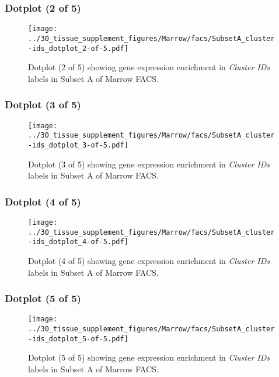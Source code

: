 \clearpage

\subsubsection{Dotplot (2 of 5)}
\begin{figure}[h]
\centering
\texttt{[image: ../30\_tissue\_supplement\_figures/Marrow/facs/SubsetA\_cluster-ids\_dotplot\_2-of-5.pdf]}

\caption{ Dotplot (2 of 5)  showing gene expression enrichment in \emph{Cluster IDs} labels in Subset A of Marrow FACS. }
\end{figure}


\clearpage

\subsubsection{Dotplot (3 of 5)}
\begin{figure}[h]
\centering
\texttt{[image: ../30\_tissue\_supplement\_figures/Marrow/facs/SubsetA\_cluster-ids\_dotplot\_3-of-5.pdf]}

\caption{ Dotplot (3 of 5)  showing gene expression enrichment in \emph{Cluster IDs} labels in Subset A of Marrow FACS. }
\end{figure}


\clearpage

\subsubsection{Dotplot (4 of 5)}
\begin{figure}[h]
\centering
\texttt{[image: ../30\_tissue\_supplement\_figures/Marrow/facs/SubsetA\_cluster-ids\_dotplot\_4-of-5.pdf]}

\caption{ Dotplot (4 of 5)  showing gene expression enrichment in \emph{Cluster IDs} labels in Subset A of Marrow FACS. }
\end{figure}


\clearpage

\subsubsection{Dotplot (5 of 5)}
\begin{figure}[h]
\centering
\texttt{[image: ../30\_tissue\_supplement\_figures/Marrow/facs/SubsetA\_cluster-ids\_dotplot\_5-of-5.pdf]}

\caption{ Dotplot (5 of 5)  showing gene expression enrichment in \emph{Cluster IDs} labels in Subset A of Marrow FACS. }
\end{figure}



